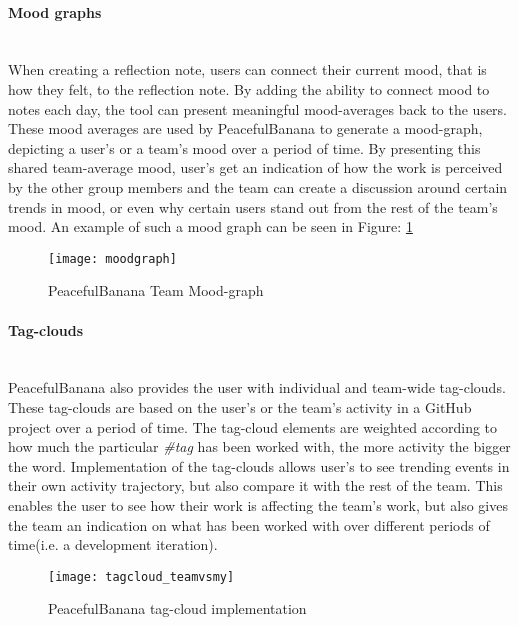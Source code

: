 \paragraph{Mood graphs}\mbox{}\\
When creating a reflection note, users can connect their current mood, that is how they felt, to the reflection note. By adding the ability to connect mood to notes each day, the tool can present meaningful mood-averages back to the users. These mood averages are used by PeacefulBanana to generate a mood-graph, depicting a user's or a team's mood over a period of time. 
By presenting this shared team-average mood, user's get an indication of how the work is perceived by the other group members and the team can create a discussion around certain trends in mood, or even why certain users stand out from the rest of the team's mood. 
An example of such a mood graph can be seen in Figure: \ref{moodgraphfunc}
\begin{figure}[H]
    \centering
        \texttt{[image: moodgraph]}
    \caption{PeacefulBanana Team Mood-graph}
    \label{moodgraphfunc}
\end{figure}
\paragraph{Tag-clouds}\mbox{}\\
PeacefulBanana also provides the user with individual and team-wide tag-clouds. These tag-clouds are based on the user's or the team's activity in a GitHub project over a period of time. The tag-cloud elements are weighted according to how much the particular \emph{\#tag} has been worked with, the more activity the bigger the word. Implementation of the tag-clouds allows user's to see trending events in their own activity trajectory, but also compare it with the rest of the team. This enables the user to see how their work is affecting the team's work, but also gives the team an indication on what has been worked with over different periods of time(i.e. a development iteration). 
\begin{figure}[H]
    \centering
        \texttt{[image: tagcloud\_teamvsmy]}
    \caption{PeacefulBanana tag-cloud implementation}
    \label{tagcloudfunc}
\end{figure}

